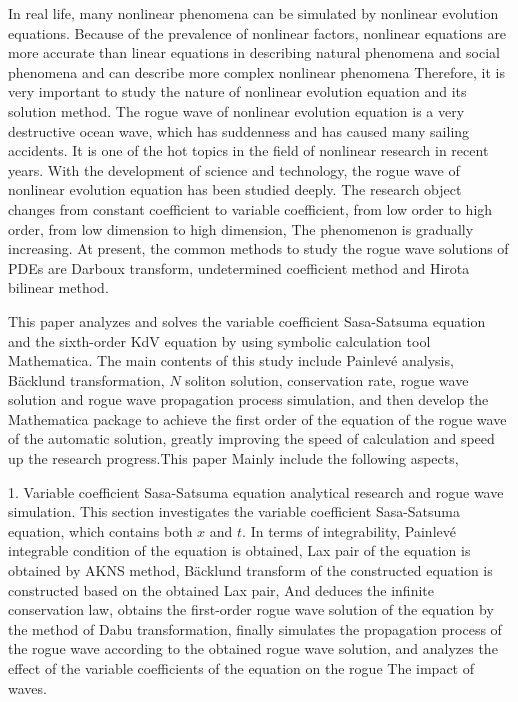 \begin{eabstract}
In real life, many nonlinear phenomena can be simulated by nonlinear evolution equations. Because of the prevalence of nonlinear factors, nonlinear equations are more accurate than linear equations in describing natural phenomena and social phenomena and can describe more complex nonlinear phenomena Therefore, it is very important to study the nature of nonlinear evolution equation and its solution method. The rogue wave of nonlinear evolution equation is a very destructive ocean wave, which has suddenness and has caused many sailing accidents. It is one of the hot topics in the field of nonlinear research in recent years.
With the development of science and technology, the rogue wave of nonlinear evolution equation has been studied deeply. The research object changes from constant coefficient to variable coefficient, from low order to high order, from low dimension to high dimension, The phenomenon is gradually increasing. At present, the common methods to study the rogue wave solutions of PDEs are Darboux transform, undetermined coefficient method and Hirota bilinear method.

This paper analyzes and solves the variable coefficient Sasa-Satsuma equation and the sixth-order KdV equation by using symbolic calculation tool Mathematica. The main contents of this study include Painlev\'{e} analysis, B\"{a}cklund transformation, $N$ soliton solution, conservation rate, rogue wave solution and rogue wave propagation process simulation, and then develop the Mathematica package to achieve the first order of the equation of the rogue wave of the automatic solution, greatly improving the speed of calculation and speed up the research progress.This paper Mainly include the following aspects,

1. Variable coefficient Sasa-Satsuma equation analytical research and rogue wave simulation.
This section investigates the variable coefficient Sasa-Satsuma equation, which contains both $x$ and $t$. In terms of integrability, Painlev\'{e} integrable condition of the equation is obtained, Lax pair of the equation is obtained by AKNS method, B\"{a}cklund transform of the constructed equation is constructed based on the obtained Lax pair, And deduces the infinite conservation law, obtains the first-order rogue wave solution of the equation by the method of Dabu transformation, finally simulates the propagation process of the rogue wave according to the obtained rogue wave solution, and analyzes the effect of the variable coefficients of the equation on the rogue The impact of waves.


\end{eabstract}
